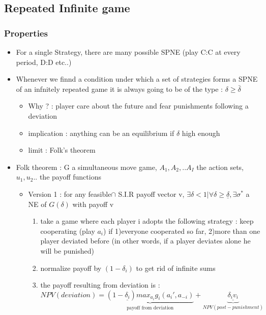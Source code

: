 \documentclass{article}
\begin{document}
\subsection{Repeated Infinite game}

\subsubsection{Properties}
\begin{itemize}
    \item For a single Strategy, there are many possible SPNE (play C:C at every period, D:D etc..)
    \item Whenever we finnd a condition under which a set of strategies forms a SPNE of an infnitely repeated game it is always going to be of the type : $\delta \geq \bar{\delta}$
    \begin{itemize}
        \item Why ? : player care about the future and fear punishments following a deviation
        \item implication : anything can be an equilibrium if $\delta$ high enough
        \item limit : Folk's theorem
    \end{itemize}
    \item Folk theorem : G a simultaneous move game, $A_1,A_2,..A_I$ the action sets, $u_1,u_2..$ the payoff functions 
    \begin{itemize}
        \item Version 1 : for any feasible$\cap$ S.I.R payoff vector v, $\exists\delta<1|\forall\delta\geq\underline{\delta}, \exists\sigma^*$ a NE of $G(\delta)$ with payoff v
\begin{Proof}
    \begin{enumerate}
        \item take a game where each player i adopts the following strategy : keep cooperating (play $a_i$) if 1)everyone cooperated so far, 2)more than one player deviated before (in other words, if a player deviates alone he will be punished)
        \item normalize payoff by $(1-\delta_i)$ to get rid of infinite sums
        \item the payoff resulting from deviation is : 
\begin{equation}
    NPV (deviation) = \underbrace{(1-\underline{\delta_i})max_{a_i}g_i(a_i',a_{-i})}_{\text{payoff from deviation}}+\underbrace{\underline{\delta_iv_i}}_{NPV (post -punishment)}
\end{equation}

\end{enumerate}
\end{Proof}
\end{itemize}
\end{itemize}
\end{document}
